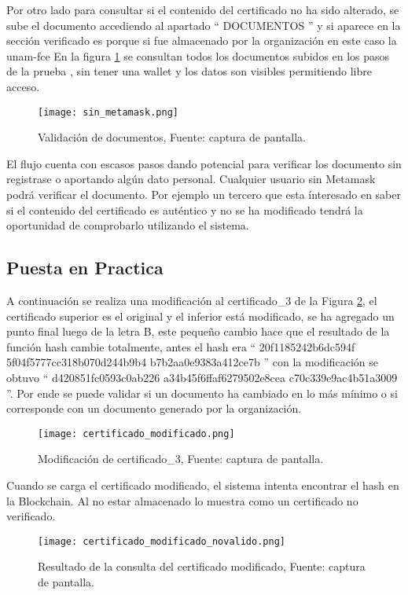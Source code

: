 Por otro lado para consultar si el contenido del certificado no ha sido alterado, se 
sube el documento accediendo al apartado “ DOCUMENTOS ”   y si aparece en la sección verificado
es porque si fue almacenado por la organización en este caso la \gls{unam}-\gls{fce}
En la figura \ref{img:sin_metamask} se consultan todos los documentos subidos en los pasos de la prueba , sin tener  una wallet y los datos
son visibles permitiendo libre acceso. 
\begin{figure}[H]
  \centering
  {\texttt{[image: sin\_metamask.png]}}
  \caption{Validación de documentos,  Fuente: captura de pantalla. }
  \label{img:sin_metamask}
\end{figure}


El flujo cuenta con escasos pasos dando potencial para  verificar los documento sin registrase o aportando algún dato personal.
Cualquier usuario sin Metamask podrá verificar el documento. Por ejemplo un tercero que esta ínteresado en saber si el contenido del certificado
es auténtico y no se ha modificado tendrá la oportunidad de comprobarlo utilizando el sistema.
\subsection{Puesta en Practica}

A continuación se realiza una modificación al certificado\_3 de la Figura \ref{img:certificado_modificado}, el certificado superior es el original y el inferior está modificado, se ha agregado un 
punto final luego de la letra B, este pequeño cambio hace que el resultado de la función hash cambie totalmente,
antes el hash era “ 20f1185242b6dc594f 5f04f5777cc318b070d244b9b4 b7b2aa0e9383a412ce7b ” con la modificación se obtuvo “ d420851fc0593c0ab226 a34b45f6ffaf6279502e8cea c70c339e9ac4b51a3009 ”.
Por ende se puede validar si un documento ha cambiado en lo más mínimo o si corresponde con un documento generado por la organización.

\begin{figure}[H]
  \centering
  {\texttt{[image: certificado\_modificado.png]}}
  \caption{Modificación de certificado\_3,  Fuente: captura de pantalla. }
  \label{img:certificado_modificado}
\end{figure}

Cuando se carga el certificado modificado, el sistema intenta encontrar el hash  en la Blockchain. Al no estar almacenado lo muestra 
como un certificado no verificado.
\begin{figure}[H]
  \centering
  {\texttt{[image: certificado\_modificado\_novalido.png]}}
  \caption{Resultado de la consulta del certificado modificado,  Fuente: captura de pantalla. }
  \label{img:certificado_modificado_consulta}
\end{figure}

